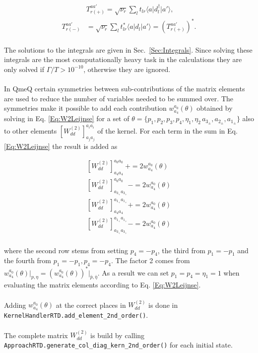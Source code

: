 \documentclass{article}
\newcommand{\bra}[1]{\ensuremath{\langle #1 |}}
\newcommand{\ket}[1]{\ensuremath{|#1\rangle}}
\begin{document}
\begin{align}
    &T^{aa'}_{r(+)} = \sqrt{\nu_r}\sum_l t_{lr} \bra{a}d_l^\dagger \ket{a'},\\
    \label{Eq:manyBodyT}
    T^{aa'}_{r(-)} &= \sqrt{\nu_r}\sum_l t^*_{lr} \bra{a}d_l \ket{a'} = \left (T^{aa'}_{r(+)}\right ) ^*.
\end{align}
\\
The solutions to the integrals are given in Sec.~\ref{Sec:Integrals}. Since solving these integrals are the most computationally heavy task in the calculations they are only solved if $\Gamma/T>10^{-10}$, otherwise they are ignored.
\\
\\
In QmeQ certain symmetries between sub-contributions of the matrix elements are used to reduce the number of variables needed to be summed over. The symmetries make it possible to add each contribution $w^{a_0}_{a_4}(\theta)$ obtained by solving in Eq. \ref{Eq:W2Leijnse} for a set of $\theta=\{p_1,p_2,p_3,p_4,\eta_1,\eta_2\, a_{3_\pm}, a_{2_\pm}, a_{1_\pm} \}$ also to other elements $\left [ W^{(2)}_{dd} \right ]^{a_ia_i}_{a_ja_j}$ of the kernel. For each term in the sum in Eq. \ref{Eq:W2Leijnse} the result is added as 

\begin{align}
    \left [ W^{(2)}_{dd} \right ]^{a_0a_0}_{a_4a_4}\ += 2w^{a_0}_{a_4}(\theta)\label{Eq:W2symmetries1}\\
    \left [ W^{(2)}_{dd} \right ]^{a_0a_0}_{a_{3_+}a_{3_+}} -= 2w^{a_0}_{a_4}(\theta)\\
    \left [ W^{(2)}_{dd} \right ]^{a_{1_+}a_{1_+}}_{a_4a_4} += 2w^{a_0}_{a_4}(\theta)\\
    \left [ W^{(2)}_{dd} \right ]^{a_{1_+}a_{1_+}}_{a_{3_+}a_{3_+}} -= 2w^{a_0}_{a_4}(\theta)\label{Eq:W2symmetries4}
\end{align}
\\
where the second row stems from setting $p_4=-p_4$, the third from $p_1=-p_1$ and the fourth from $p_1=-p_1, p_4=-p_4$. The factor 2 comes from $w^{a_0}_{a_4}(\theta)\big|_{p, \eta}=\left (w^{a_0}_{a_4}(\theta)\right)^*\big|_{\bar{p}, \bar{\eta}}$. As a result we can set $p_1=p_4=\eta_1=1$ when evaluating the matrix elements according to Eq. \ref{Eq:W2Leijnse}. 
\\
\\
Adding $w^{a_0}_{a_4}(\theta)$ at the correct places in $W^{(2)}_{dd}$ is done in \verb!KernelHandlerRTD.add_element_2nd_order()!.
\\
\\
The complete matrix $W_{dd}^{(2)}$ is build by calling \verb!ApproachRTD.generate_col_diag_kern_2nd_order()! for each initial state. 
\\
\\
\end{document}
